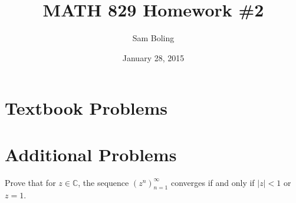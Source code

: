 \documentclass{article}
\title{MATH 829 Homework \#2}
\date{January 28, 2015}
\author{Sam Boling}
\newcounter{Problem}
\newenvironment{Problem}{\begin{Exercise}[name={Problem},
                                          counter={Problem}]}
                        {\end{Exercise}}
\begin{document}
\begin{titlepage}
\maketitle
\end{titlepage}

\section{Textbook Problems}

\section{Additional Problems}

\begin{Problem}
  Prove that for $z \in \mathbb{C}$, the sequence $(z^n)_{n=1}^\infty$
  converges if and only if $|z| < 1$ or $z = 1$.
\end{Problem}
\end{document}
